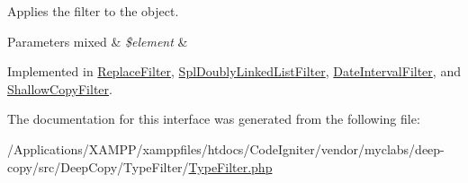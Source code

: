 Applies the filter to the object.


\begin{DoxyParams}[1]{Parameters}
mixed & {\em \$element} & \\
\hline
\end{DoxyParams}


Implemented in \mbox{\hyperlink{class_deep_copy_1_1_type_filter_1_1_replace_filter_a959e75f8f2b305dcf33633745c338176}{Replace\+Filter}}, \mbox{\hyperlink{class_deep_copy_1_1_type_filter_1_1_spl_1_1_spl_doubly_linked_list_filter_a959e75f8f2b305dcf33633745c338176}{Spl\+Doubly\+Linked\+List\+Filter}}, \mbox{\hyperlink{class_deep_copy_1_1_type_filter_1_1_date_1_1_date_interval_filter_a959e75f8f2b305dcf33633745c338176}{Date\+Interval\+Filter}}, and \mbox{\hyperlink{class_deep_copy_1_1_type_filter_1_1_shallow_copy_filter_a959e75f8f2b305dcf33633745c338176}{Shallow\+Copy\+Filter}}.



The documentation for this interface was generated from the following file\+:\begin{DoxyCompactItemize}
\item 
/\+Applications/\+X\+A\+M\+P\+P/xamppfiles/htdocs/\+Code\+Igniter/vendor/myclabs/deep-\/copy/src/\+Deep\+Copy/\+Type\+Filter/\mbox{\hyperlink{_type_filter_8php}{Type\+Filter.\+php}}\end{DoxyCompactItemize}
